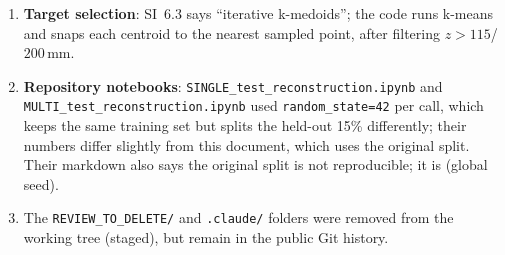 \documentclass[10pt,a4paper]{article}
\begin{document}
\begin{priv}
\begin{enumerate}
\item \textbf{Target selection}: SI~6.3 says ``iterative k-medoids''; the code runs k-means and snaps each centroid to the nearest sampled point, after filtering $z>115$/$200$\,mm.
\item \textbf{Repository notebooks}: \texttt{SINGLE\_test\_reconstruction.ipynb} and \texttt{MULTI\_test\_reconstruction.ipynb} used \texttt{random\_state=42} per call, which keeps the same training set but splits the held-out 15\% differently; their numbers differ slightly from this document, which uses the original split. Their markdown also says the original split is not reproducible; it is (global seed).
\item The \texttt{REVIEW\_TO\_DELETE/} and \texttt{.claude/} folders were removed from the working tree (staged), but remain in the public Git history.
\end{enumerate}
\end{priv}

\clearpage
\appendix
\renewcommand{\thesection}{\Alph{section}}
\end{document}
